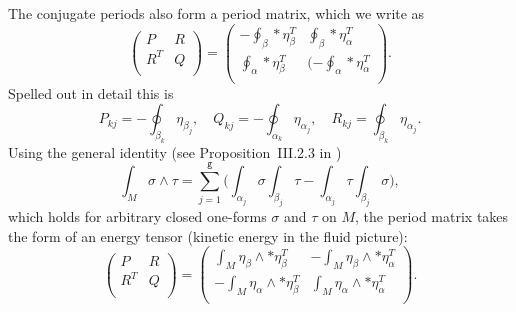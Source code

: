 \documentclass[reqno,12pt]{article}
\theoremstyle{plain}
\theoremstyle{definition}
\numberwithin{equation}{section}
\numberwithin{figure}{section}
\begin{document}
The conjugate periods also form a period matrix, which we write as
\begin{equation}\label{PRRQ}
\left( \begin{array}{cc}
                                            P & R  \\
                                              R^T & Q  \\
\end{array} \right)=
\left( \begin{array}{cc} 
                                             - \oint_{\beta}*\eta_{\beta}^T & \oint_{\beta}*\eta_{\alpha}^T  \\
                                               \oint_{\alpha}*\eta_{\beta}^T & ( -\oint_{\alpha}*\eta_{\alpha}^T  \\
\end{array} \right).
\end{equation}
Spelled out in detail this is
$$
P_{kj}=-\oint_{\beta_k}\eta_{\beta_j}, \quad Q_{kj}=-\oint_{\alpha_k}\eta_{\alpha_j}, \quad R_{kj}=\oint_{\beta_k}\eta_{\alpha_j}.
$$
Using the general identity (see Proposition~III.2.3 in \cite{Farkas-Kra-1992})
\begin{equation}\label{general identity}
\int_M \sigma\wedge\tau=\sum_{j=1}^\texttt{g} \Big( \int_{\alpha_j}\sigma \int_{\beta_j}\tau -\int_{\alpha_j}\tau\int_{\beta_j}\sigma\Big),
\end{equation}
which holds for arbitrary closed one-forms $\sigma$ and $\tau$ on $M$,
the period matrix takes the form of an energy tensor (kinetic energy in the fluid picture):
\begin{equation}\label{ointdU}
\left( \begin{array}{cc}
                                            P & R  \\
                                              R^T & Q  \\
\end{array} \right)
=
\left( \begin{array}{cc}
                                             \int_M \eta_{\beta}\wedge *\eta_{\beta}^T &  -\int_M \eta_{\beta}\wedge *\eta_{\alpha}^T  \\
                                              - \int_M \eta_{\alpha}\wedge*\eta_{\beta}^T &   \int_M \eta_{\alpha}\wedge *\eta_{\alpha}^T  \\
\end{array} \right).
\end{equation}
\end{document}
